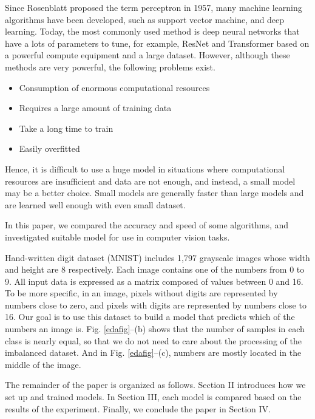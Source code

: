 \documentclass[main.tex]{subfiles}
\begin{document}
Since Rosenblatt proposed the term perceptron in 1957,
many machine learning algorithms have been developed,
such as support vector machine, and deep learning.
Today, the most commonly used method is deep neural networks that have a lots of parameters to tune, for example, ResNet and Transformer
based on a powerful compute equipment and a large dataset.
However, although these methods are very powerful, the following problems exist.

\begin{itemize}
	\item Consumption of enormous computational resources
	\item Requires a large amount of training data
	\item Take a long time to train
	\item Easily overfitted
\end{itemize}

Hence, it is difficult to use a huge model in situations
where computational resources are insufficient and data are not enough,
and instead, a small model may be a better choice.
Small models are generally faster than large models
and are learned well enough with even small dataset.

In this paper, we compared the accuracy and speed of some algorithms,
and investigated suitable model for use in computer vision tasks.

Hand-written digit dataset (MNIST) includes 1,797 grayscale images whose width and height are 8 respectively.
Each image contains one of the numbers from 0 to 9.
All input data is expressed as a matrix composed of values between 0 and 16.
To be more specific, in an image, pixels without digits are represented by numbers close to zero,
and pixels with digits are represented by numbers close to 16.
Our goal is to use this dataset to build a model that predicts which of the numbers an image is.
Fig. \ref*{edafig}--(b) shows that the number of samples in each class is nearly equal, so that we do not need to care about the processing of the imbalanced dataset.
And in Fig. \ref*{edafig}--(c), numbers are mostly located in the middle of the image.

The remainder of the paper is organized as follows.
Section II introduces how we set up and trained models.
In Section III, each model is compared based on the results of the experiment.
Finally, we conclude the paper in Section IV.
\end{document}

